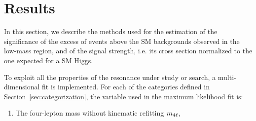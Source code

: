 \section{Results}

In this section, we describe the methods used for the estimation of the significance of the excess of events above the SM backgrounds observed in the low-mass region, and of the signal strength, i.e. its cross section normalized to the one expected for a SM Higgs.

To exploit all the properties of the resonance under study or search, a multi-dimensional fit is implemented.
For each of the categories defined in Section~\ref{sec:categorization}, the variable used in the maximum likelihood fit is:
\begin{enumerate}
\item The four-lepton mass without kinematic refitting $m_{4\ell}$, %
\end{enumerate}

